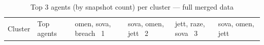 \begin{table}[ht]
\centering
\caption{Top 3 agents (by snapshot count) per cluster — full merged data}
\begin{tabular}{rl}
\toprule
Cluster & Top agents \
 & omen, sova, breach \
1 & sova, omen, jett \
2 & jett, raze, sova \
3 & sova, omen, jett \
\bottomrule
\end{tabular}
\label{tab:cluster_agents_full}
\end{table}

